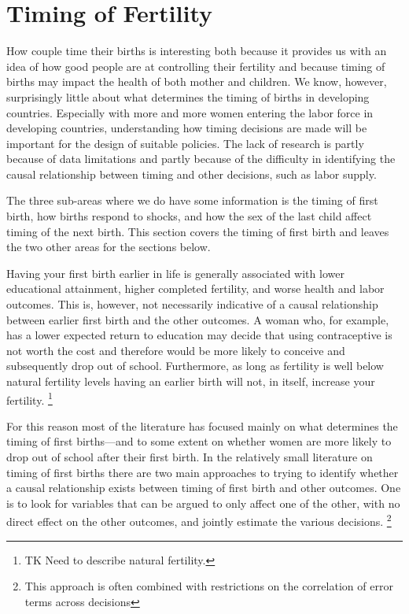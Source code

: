 \documentclass[letterpaper,12pt]{article}
\begin{document}
\section{Timing of Fertility}

How couple time their births is interesting both because it provides
us with an idea of how good people are at controlling their
fertility and because timing of births may impact the health
of both mother and children.
We know, however, surprisingly little about what determines the
timing of births in developing countries.
Especially with more and more women entering the labor force
in developing countries, understanding how timing decisions are made will
be important for the design of suitable policies.
The lack of research is partly because of data limitations and 
partly because of the difficulty in identifying the causal relationship 
between timing and other decisions, such as labor supply.

The three sub-areas where we do have some information is the timing of 
first birth, how births respond to shocks, and how the sex of the 
last child affect timing of the next birth.
This section covers the timing of first birth and leaves the two
other areas for the sections below.

Having your first birth earlier in life is generally associated
with lower educational attainment, higher completed fertility,
and worse health and labor outcomes.
This is, however, not necessarily indicative of a causal
relationship between earlier first birth and the other outcomes.
A woman who, for example, has a lower expected return to education
may decide that using contraceptive is not worth the cost and 
therefore would be more likely to conceive and subsequently
drop out of school.
Furthermore, as long as fertility is well below natural
fertility levels having an earlier birth will not, in itself,
increase your fertility.%
\footnote{
TK Need to describe natural fertility.
}


For this reason most of the literature has focused mainly
on what determines the timing of first births---and to some
extent on whether women are more likely to drop out of
school after their first birth.
In the relatively small literature on timing of first
births there are two main approaches to trying to identify
whether a causal relationship exists between timing of
first birth and other outcomes.
One is to look for variables that can be argued to only
affect one of the other, with no direct effect on the 
other outcomes, and jointly estimate the various decisions.%
\footnote{
This approach is often combined with restrictions on the
correlation of error terms across decisions
}
\end{document}
